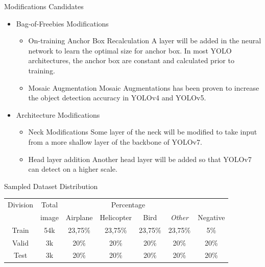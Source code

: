 \documentclass[final,hyperref={pdfpagelabels=false}]{beamer}
\begin{document}
\begin{frame}[t]
\begin{columns}[t]
\begin{column}{.465\textwidth}
\begin{block}{Modifications Candidates}
  \begin{itemize}
    \item Bag-of-Freebies Modifications
    \begin{itemize}
      \item On-training Anchor Box Recalculation
      A layer will be added in the neural network to learn the optimal size
      for anchor box. 
      In most YOLO architectures, the anchor box are constant and calculated prior to training.
      \item Mosaic Augmentation
      Mosaic Augmentations has been proven to increase the object detection accuracy in YOLOv4 and YOLOv5.
    \end{itemize}
    \item Architecture Modifications
    \begin{itemize}
      \item Neck Modifications
      Some layer of the neck will be modified to take input from a more shallow layer of the backbone of YOLOv7.
      \item Head layer addition
      Another head layer will be added so that YOLOv7 can detect on a higher scale.
    \end{itemize}
  \end{itemize}
\end{block}

\begin{block}{Sampled Dataset Distribution}

\begin{table}
\small
\begin{tabular}{|c|c|c|c|c|c|c|}
        \hline
        Division &Total & \multicolumn{4}{c}{Percentage}&\\
                           \cline{3-7}
                  &image& Airplane & Helicopter & Bird & \emph{Other} & Negative\\
        \hline
        Train  &54k &23,75\%  &23,75\%     &23,75\% &23,75\%       &5\%\\
        \hline                                              
        Valid&3k  &20\%     &20\%        &20\%    &20\%          &20\%\\
        \hline                                                           
        Test      &3k  &20\%     &20\%        &20\%    &20\%          &20\%\\
        \hline
\end{tabular}
\end{table}


\end{block}
\end{column}
\end{columns}
\end{frame}
\end{document}
